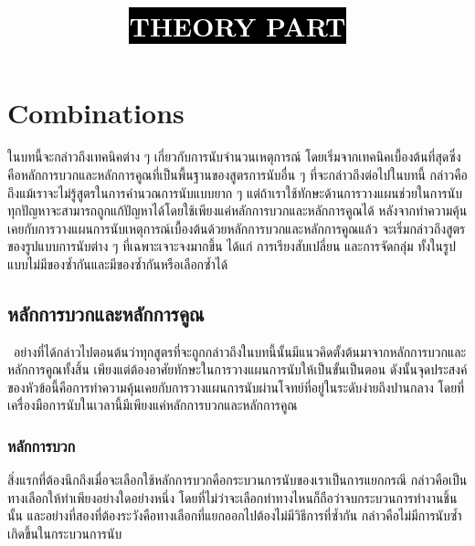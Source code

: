 \chapter{Combinations}

\begin{center}
	   \title{\sffamily\colorbox{black}{\bfseries\textcolor{white}{\Large THEORY PART}}}
\end{center}

ในบทนี้จะกล่าวถึงเทคนิคต่าง ๆ เกี่ยวกับการนับจำนวนเหตุการณ์ โดยเริ่มจากเทคนิคเบื้องต้นที่สุดซึ่งคือหลักการบวกและหลักการคูณที่เป็นพื้นฐานของสูตรการนับอื่น ๆ ที่จะกล่าวถึงต่อไปในบทนี้ กล่าวคือถึงแม้เราจะไม่รู้สูตรในการคำนวณการนับแบบยาก ๆ แต่ถ้าเราใช้ทักษะด้านการวางแผนช่วยในการนับ ทุกปัญหาจะสามารถถูกแก้ปัญหาได้โดยใช้เพียงแค่หลักการบวกและหลักการคูณได้ หลังจากทำความคุ้นเคยกับการวางแผนการนับเหตุการณ์เบื้องต้นด้วยหลักการบวกและหลักการคูณแล้ว จะเริ่มกล่าวถึงสูตรของรูปแบบการนับต่าง ๆ ที่เฉพาะเจาะจงมากขึ้น ได้แก่ การเรียงสับเปลี่ยน และการจัดกลุ่ม ทั้งในรูปแบบไม่มีของซ้ำกันและมีของซ้ำกันหรือเลือกซ้ำได้

\section{หลักการบวกและหลักการคูณ}

~\indent อย่างที่ได้กล่าวไปตอนต้นว่าทุกสูตรที่จะถูกกล่าวถึงในบทนี้นั้นมีแนวคิดตั้งต้นมาจากหลักการบวกและหลักการคูณทั้งสิ้น เพียงแต่ต้องอาศัยทักษะในการวางแผนการนับให้เป็นขั้นเป็นตอน ดังนั้นจุดประสงค์ของหัวข้อนี้คือการทำความคุ้นเคยกับการวางแผนการนับผ่านโจทย์ที่อยู่ในระดับง่ายถึงปานกลาง โดยที่เครื่องมือการนับในเวลานี้มีเพียงแค่หลักการบวกและหลักการคูณ

\subsection{หลักการบวก}

สิ่งแรกที่ต้องนึกถึงเมื่อจะเลือกใช้หลักการบวกคือกระบวนการนับของเราเป็นการแยกกรณี กล่าวคือเป็นทางเลือกให้ทำเพียงอย่างใดอย่างหนึ่ง โดยที่ไม่ว่าจะเลือกทำทางไหนก็ถือว่าจบกระบวนการทำงานชิ้นนั้น และอย่างที่สองที่ต้องระวังคือทางเลือกที่แยกออกไปต้องไม่มีวิธีการที่ซ้ำกัน กล่าวคือไม่มีการนับซ้ำเกิดขึ้นในกระบวนการนับ

